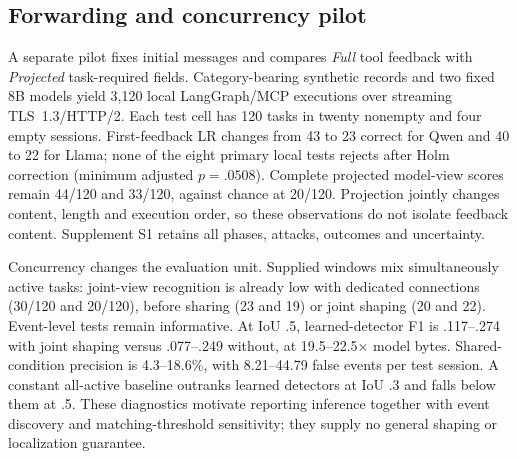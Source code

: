 \subsection{Forwarding and concurrency pilot}\label{sec:live-study}
A separate pilot fixes initial messages and compares \emph{Full} tool feedback with \emph{Projected} task-required fields. Category-bearing synthetic records and two fixed 8B models yield 3,120 local LangGraph/MCP executions over streaming TLS~1.3/HTTP/2. Each test cell has 120 tasks in twenty nonempty and four empty sessions. First-feedback LR changes from 43 to 23 correct for Qwen and 40 to 22 for Llama; none of the eight primary local tests rejects after Holm correction (minimum adjusted $p=.0508$). Complete projected model-view scores remain 44/120 and 33/120, against chance at 20/120. Projection jointly changes content, length and execution order, so these observations do not isolate feedback content. Supplement S1 retains all phases, attacks, outcomes and uncertainty.

Concurrency changes the evaluation unit. Supplied windows mix simultaneously active tasks: joint-view recognition is already low with dedicated connections (30/120 and 20/120), before sharing (23 and 19) or joint shaping (20 and 22). Event-level tests remain informative. At IoU .5, learned-detector F1 is .117--.274 with joint shaping versus .077--.249 without, at 19.5--22.5$\times$ model bytes. Shared-condition precision is 4.3--18.6\%, with 8.21--44.79 false events per test session. A constant all-active baseline outranks learned detectors at IoU .3 and falls below them at .5. These diagnostics motivate reporting inference together with event discovery and matching-threshold sensitivity; they supply no general shaping or localization guarantee.
